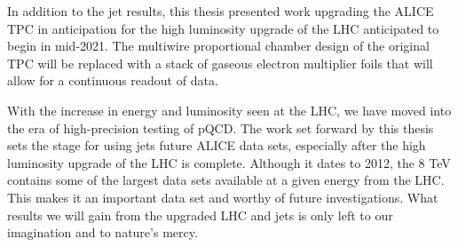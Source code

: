 In addition to the jet results, this thesis presented work upgrading the ALICE TPC in anticipation for the high luminosity upgrade of the LHC anticipated to begin in mid-2021.  The multiwire proportional chamber design of the original TPC will be replaced with a stack of gaseous electron multiplier foils that will allow for a continuous readout of data.

With the increase in energy and luminosity seen at the LHC, we have moved into the era of high-precision testing of pQCD.  The work set forward by this thesis sets the stage for using jets future ALICE data sets, especially after the high luminosity upgrade of the LHC is complete.  Although it dates to 2012, the 8 TeV contains some of the largest data sets available at a given energy from the LHC.  This makes it an important data set and worthy of future investigations.  What results we will gain from the upgraded LHC and jets is only left to our imagination and to nature's mercy.